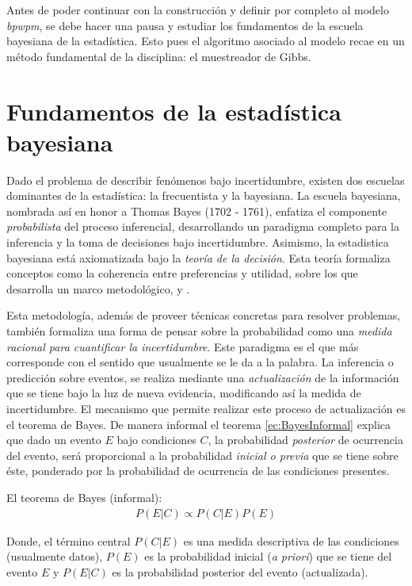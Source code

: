 \documentclass[../Main/Main.tex]{subfiles}
\begin{document}
Antes de poder continuar con la construcción y definir por completo al modelo \textit{bpwpm}, se debe hacer una pausa y estudiar los fundamentos de la escuela bayesiana de la estadística. Esto pues el algoritmo asociado al modelo recae en un método fundamental de la disciplina: el muestreador de Gibbs.

\section{Fundamentos de la estadística bayesiana}
Dado el problema de describir fenómenos bajo incertidumbre, existen dos escuelas dominantes de la estadística: la frecuentista y la bayesiana. %
La escuela bayesiana, nombrada así en honor a Thomas Bayes (1702 - 1761), enfatiza el componente \textit{probabilista} del proceso inferencial, desarrollando un paradigma completo para la inferencia y la toma de decisiones bajo incertidumbre. Asimismo, la estadistica bayesiana está axiomatizada bajo la \textit{teoría de la decisión}. Esta teoría formaliza conceptos como la coherencia entre preferencias y utilidad, sobre los que desarrolla un marco metodológico, \citet{bernardo2001bayesian} y \citet{mendoza2011estadistica}.

Esta metodología, además de proveer técnicas concretas para resolver problemas, también formaliza una forma de pensar sobre la probabilidad como una \textit{medida racional para cuantificar la incertidumbre}. Este paradigma es el que más corresponde con el sentido que usualmente se le da a la palabra. La inferencia o predicción sobre eventos, se realiza mediante una \textit{actualización} de la información que se tiene bajo la luz de nueva evidencia, modificando así la medida de incertidumbre. El mecanismo que permite realizar este proceso de actualización es el teorema de Bayes. De manera informal el teorema \eqref{ec:BayesInformal} explica que dado un evento $E$ bajo condiciones $C$, la probabilidad \textit{posterior} de ocurrencia del evento, será proporcional a la probabilidad \textit{inicial o previa} que se tiene sobre éste, ponderado por la probabilidad de ocurrencia de las condiciones presentes. \\ %

\begin{theorem} El teorema de Bayes (informal):
\begin{align}
P(E|C) \propto P(C|E)P(E) \label{ec:BayesInformal}
\end{align}
\end{theorem}
\vspace*{-.7cm}
Donde, el término central $P(C|E)$ es una medida descriptiva de las condiciones (usualmente datos), $P(E)$ es la probabilidad inicial (\textit{a priori}) que se tiene del evento $E$ y $P(E|C)$ es la probabilidad posterior del evento (actualizada).
\end{document}
